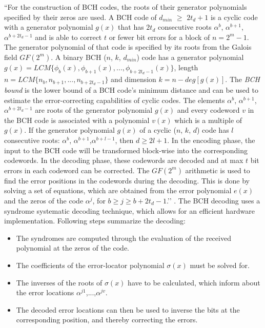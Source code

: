 ``For the construction of BCH codes, the roots of their generator polynomials specified by their zeros are used. A BCH code of $d_{min}$ $\geq$ $2t_d + 1$ is a cyclic code with a generator polynomial $g(x)$ that has $2t_d$ consecutive roots $\alpha^b$, $\alpha^{b+1}$,$\alpha^{b+2t_d-1}$ and is able to correct $t$ or fewer bit errors for a block of $n = 2^m - 1$. The generator polynomial of that code is specified by its roots from the Galois field $GF(2^m)$. A binary BCH ($n$, $k$, $d_{min}$) code
has a generator polynomial $g(x) = LCM\{\phi_{b}(x), \phi_{b+1}(x),...,\phi_{b+2t_{d}-1}(x)\}$, length $n = LCM\{n_b,n_{b+1},...,n_{b+2t_d-1}\}$ and dimension $k = n - deg[g(x)]$. The \emph{BCH bound} is the lower bound of a BCH code’s minimum distance and can be used to estimate the error-correcting capabilities of cyclic codes. The elements $\alpha^b$, $\alpha^{b+1}$,$\alpha^{b+2t_d-1}$ are roots of the generator polynomial $g(x)$ and every codeword $v$ in the BCH code is associated with a
polynomial $v(x)$ which is a multiple of $g(x)$. If the generator polynomial $g(x)$ of a cyclic ($n$, $k$, $d$) code has $l$ consecutive roots: $\alpha^b$, $\alpha^{b+1}$,$\alpha^{b+l-1}$, then $d \geq 2l +1$. In the encoding phase, the input to the BCH code will be transformed block-wise into the corresponding codewords. In the decoding phase, these codewords are decoded and at max $t$ bit errors in each codeword can be corrected. The $GF(2^m)$ arithmetic is used to find the error positions
in the codewords during the decoding. This is done by solving a set of equations, which are obtained from the error polynomial $e(x)$ and the zeros of the code $\alpha^j$, for $b \geq j \geq b + 2t_d - 1$.’’ \cite{66}. The BCH decoding uses a syndrome systematic decoding technique, which allows for an efficient hardware implementation. Following steps summarize the decoding:

\begin{itemize}\itemsep-\the\parsep %
\item The syndromes are computed through the evaluation of the received polynomial at the zeros of the code.
\item The coefficients of the error-locator polynomial $\sigma(x)$ must be solved for.
\item The inverses of the roots of $\sigma(x)$ have to be calculated, which inform about the error locations $\alpha^{j1}$,...,$\alpha^{jv}$.
\item The decoded error locations can then be used to inverse the bits at the corresponding position, and thereby correcting the errors.
\end{itemize}


